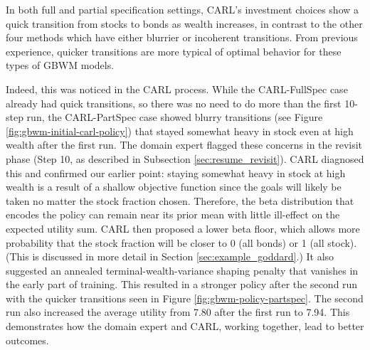 \documentclass[mnsc,sglanonrev]{informs4}
\begin{document}



In both full and partial specification settings, CARL's investment choices show a quick transition from stocks to bonds as wealth increases, in contrast to the other four methods which have either blurrier or incoherent transitions. From previous experience, quicker transitions are more typical of optimal behavior for these types of GBWM models. 

Indeed, this was noticed in the CARL process. While the CARL-FullSpec case already had quick transitions, so there was no need to do more than the first 10-step run, the CARL-PartSpec case showed blurry transitions (see Figure \ref{fig:gbwm-initial-carl-policy}) that stayed somewhat heavy in stock even at high wealth after the first run. The domain expert flagged these concerns in the revisit phase (Step 10, as described in Subsection \ref{sec:resume_revisit}). CARL diagnosed this and confirmed our earlier point: staying somewhat heavy in stock at high wealth is a result of a shallow objective function since the goals will likely be taken no matter the stock fraction chosen. Therefore, the beta distribution that encodes the policy can remain near its prior mean with little ill-effect on the expected utility sum. CARL then proposed a lower beta floor, which allows more probability that the stock fraction will be closer to 0 (all bonds) or 1 (all stock). (This is discussed in more detail in Section \ref{sec:example_goddard}.) It also suggested an annealed terminal-wealth-variance shaping penalty that vanishes in the early part of training. This resulted in a stronger policy after the second run with the quicker transitions seen in Figure \ref{fig:gbwm-policy-partspec}. The second run also increased the average utility from 7.80 after the first run to 7.94. This demonstrates how the domain expert and CARL, working together, lead to better outcomes. 
\end{document}
